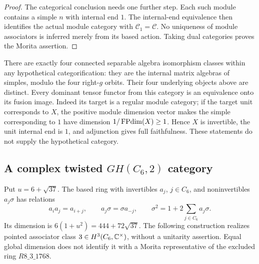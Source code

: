 \begin{proof}
The categorical conclusion needs one further step. Each such module
contains a simple $n$ with internal end $1$. The internal-end equivalence
then identifies the actual module category with $\mathcal C_1=\mathcal C$.
No uniqueness of module associators is inferred merely from its based
action. Taking dual categories proves the Morita assertion.
\end{proof}

There are exactly four connected separable algebra isomorphism classes
within any hypothetical categorification: they are the internal matrix
algebras of simples, modulo the four right-$g$ orbits. Their four
underlying objects above are distinct. Every dominant tensor functor
from this category is an equivalence onto its fusion image. Indeed its
target is a regular module category; if the target unit corresponds to
$X$, the positive module dimension vector makes the simple corresponding
to $1$ have dimension $1/\operatorname{FPdim}(X)\ge1$. Hence $X$ is invertible, the
unit internal end is $1$, and adjunction gives full faithfulness.
These statements do not supply the hypothetical category.

\subsection{A complex twisted $GH(C_6,2)$ category}
Put $u=6+\sqrt{37}$. The based ring with invertibles $a_j$, $j\in C_6$,
and noninvertibles $a_j\sigma$ has relations
\[
 a_ia_j=a_{i+j},\qquad a_j\sigma=\sigma a_{-j},\qquad
 \sigma^2=1+2\sum_{j\in C_6}a_j\sigma.
\]
Its dimension is $6(1+u^2)=444+72\sqrt{37}$. The following construction
realizes pointed associator class $3\in H^3(C_6,\mathbb C^\times)$, without a
unitarity assertion. Equal global dimension does not identify it with
a Morita representative of the excluded ring $R8\_3\_1768$.

